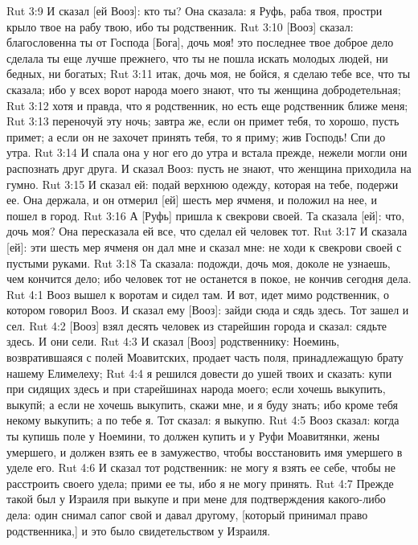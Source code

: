 \vs Rut 3:9 И сказал [ей Вооз]: кто ты? Она сказала: я Руфь, раба твоя, простри крыло твое на рабу твою, ибо ты родственник.
\vs Rut 3:10 [Вооз] сказал: благословенна ты от Господа [Бога], дочь моя! это последнее твое доброе дело сделала ты еще лучше прежнего, что ты не пошла искать молодых людей, ни бедных, ни богатых;
\vs Rut 3:11 итак, дочь моя, не бойся, я сделаю тебе все, что ты сказала; ибо у всех ворот народа моего знают, что ты женщина добродетельная;
\vs Rut 3:12 хотя и правда, что я родственник, но есть еще родственник ближе меня;
\vs Rut 3:13 переночуй эту ночь; завтра же, если он примет тебя, то хорошо, пусть примет; а если он не захочет принять тебя, то я приму; жив Господь! Спи до утра.
\vs Rut 3:14 И спала она у ног его до утра и встала прежде, нежели могли они распознать друг друга. И сказал Вооз: пусть не знают, что женщина приходила на гумно.
\vs Rut 3:15 И сказал ей: подай верхнюю одежду, которая на тебе, подержи ее. Она держала, и он отмерил [ей] шесть мер ячменя, и положил на нее, и пошел в город.
\vs Rut 3:16 А [Руфь] пришла к свекрови своей. Та сказала [ей]: что, дочь моя? Она пересказала ей все, что сделал ей человек тот.
\vs Rut 3:17 И сказала [ей]: эти шесть мер ячменя он дал мне и сказал мне: не ходи к свекрови своей с пустыми руками.
\vs Rut 3:18 Та сказала: подожди, дочь моя, доколе не узнаешь, чем кончится дело; ибо человек тот не останется в покое, не кончив сегодня дела.
\vs Rut 4:1 Вооз вышел к воротам и сидел там. И вот, идет мимо родственник, о котором говорил Вооз. И сказал ему [Вооз]: зайди сюда и сядь здесь. Тот зашел и сел.
\vs Rut 4:2 [Вооз] взял десять человек из старейшин города и сказал: сядьте здесь. И они сели.
\vs Rut 4:3 И сказал [Вооз] родственнику: Ноеминь, возвратившаяся с полей Моавитских, продает часть поля, принадлежащую брату нашему Елимелеху;
\vs Rut 4:4 я решился довести до ушей твоих и сказать: купи при сидящих здесь и при старейшинах народа моего; если хочешь выкупить, выкупй; а если не хочешь выкупить, скажи мне, и я буду знать; ибо кроме тебя некому выкупить; а по тебе я. Тот сказал: я выкупю.
\vs Rut 4:5 Вооз сказал: когда ты купишь поле у Ноемини, то должен купить и у Руфи Моавитянки, жены умершего, и должен взять ее в замужество, чтобы восстановить имя умершего в уделе его.
\vs Rut 4:6 И сказал тот родственник: не могу я взять ее себе, чтобы не расстроить своего удела; прими ее ты, ибо я не могу принять.
\vs Rut 4:7 Прежде такой был  у Израиля при выкупе и при мене для подтверждения какого-либо дела: один снимал сапог свой и давал другому, [который принимал право родственника,] и это было свидетельством у Израиля.
